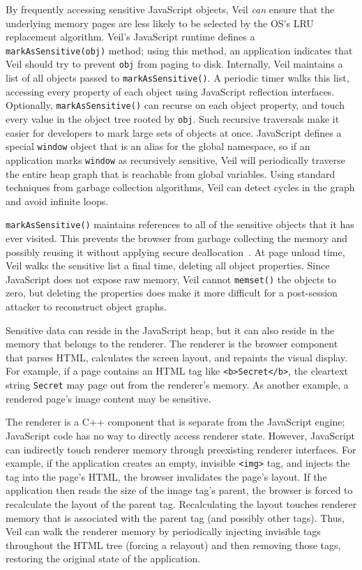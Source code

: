 By frequently accessing sensitive JavaScript
objects, Veil \emph{can} ensure that the
underlying memory pages are less likely to be
selected by the OS's LRU replacement algorithm.
Veil's JavaScript runtime defines a \texttt{markAsSensitive(obj)}
method; using this method, an application indicates
that Veil should try to prevent \texttt{obj}
from paging to disk. Internally, Veil maintains
a list of all objects passed to \texttt{markAsSensitive()}.
A periodic timer walks this list, accessing every
property of each object using JavaScript reflection
interfaces. Optionally, \texttt{markAsSensitive()} can
recurse on each object property, and touch every
value in the object tree rooted by \texttt{obj}.
Such recursive traversals make it easier for
developers to mark large sets of objects at
once. JavaScript defines a special \texttt{window}
object that is an alias for the global namespace, so
if an application marks \texttt{window} as
recursively sensitive, Veil will periodically
traverse the entire heap graph that is reachable
from global variables. Using standard techniques
from garbage collection algorithms, Veil can
detect cycles in the graph and avoid infinite
loops.

\texttt{markAsSensitive()} maintains references
to all of the sensitive objects that it has ever
visited. This prevents the browser from garbage
collecting the memory and possibly reusing it
without applying secure deallocation~\cite{chow05}.
At page unload time, Veil walks the sensitive list
a final time, deleting all object properties.
Since JavaScript does not expose raw memory,
Veil cannot \texttt{memset()} the objects to
zero, but deleting the properties does make
it more difficult for a post-session attacker
to reconstruct object graphs.

Sensitive data can reside in the JavaScript
heap, but it can also reside in the memory
that belongs to the renderer. The renderer is
the browser component that parses HTML,
calculates the screen layout, and repaints
the visual display. For example, if a page
contains an HTML tag like \texttt{<b>Secret</b>},
the cleartext string \texttt{Secret} may
page out from the renderer's memory. As another
example, a rendered page's image content
may be sensitive.

The renderer is a C++ component that is
separate from the JavaScript engine;
JavaScript code has no way to directly
access renderer state. However, JavaScript
can indirectly touch renderer memory
through preexisting renderer interfaces.
For example, if the application creates
an empty, invisible \texttt{<img>} tag,
and injects the tag into the page's HTML,
the browser invalidates the page's layout.
If the application then reads the size
of the image tag's parent, the browser is
forced to recalculate the layout of the
parent tag. Recalculating the layout
touches renderer memory that is associated
with the parent tag (and possibly other
tags). Thus, Veil can walk the renderer
memory by periodically injecting invisible
tags throughout the HTML tree (forcing
a relayout) and then removing those
tags, restoring the original state of
the application.

